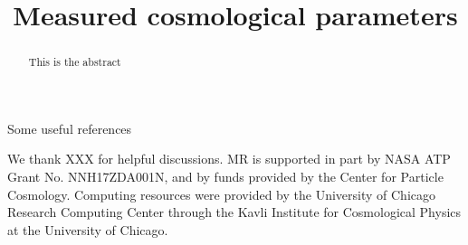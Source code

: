 \documentclass[aps,nofootinbib,notitlepage,superscriptaddress,twocolumn,10pt,prd]{revtex4-1}
\begin{document}
\title{Measured cosmological parameters}

\begin{abstract}
%
This is the abstract
%
\end{abstract}

%
\maketitle
%

Some useful references \cite{Raveri:2018wln,Raveri:2019gdp,Raveri:2021wfz}




%
\begin{acknowledgments}
%
We thank
XXX
for helpful discussions.
%
MR is supported in part by NASA ATP Grant No. NNH17ZDA001N, and by funds provided by the Center for Particle Cosmology.
%
Computing resources were provided by the University of Chicago Research Computing Center through the Kavli Institute for Cosmological Physics at the University of Chicago.
%
\end{acknowledgments}
%


%
\end{document}
